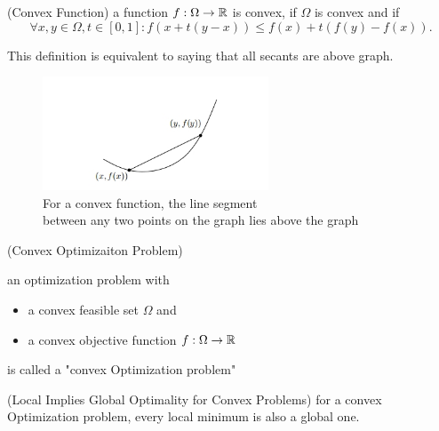 \documentclass[12pt,oneside]{book} %
\begin{document}
\begin{spacing}{1}
\begin{definition}{
    (Convex Function) %
  }{%
  }
    {
        a function $f: \Omega \rightarrow \mathbb{R}$ is convex, if $\Omega$ is convex and if
         \begin{equation}
            \forall x,y \in \Omega, t\in [0,1]: f(x+t(y-x))\leq f(x)+t(f(y)-f(x)). 
         \end{equation}
    }
\end{definition}

\begin{remark}
    This definition is equivalent to saying that
    all secants are above graph.
\end{remark}


\begin{figure}[htbp]
    \centering
    \includegraphics[width=0.6\textwidth]{figure/ch1/secant_above_graph1.png}
    \caption{For a convex function, the line segment \\ between any two points on the graph lies
    above the graph}
\end{figure}

\begin{definition}{
    (Convex Optimizaiton Problem) %
  }{%
  }
    {
        an optimization problem with 
        \begin{itemize}
            \item a convex feasible set $\Omega$ and 
            \item a convex objective function $f: \Omega\rightarrow\mathbb{R}$
        
        \end{itemize}
        is called a "convex Optimization problem"
    }
\end{definition}

\begin{theorem}{
    (Local Implies Global Optimality for Convex Problems)
}{}
    {
        for a convex Optimization problem, every local minimum is also a global one. 
    }
\end{theorem}

\begin{proofsolution}
   

\end{proofsolution}
\end{spacing}
\end{document}
